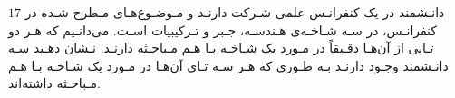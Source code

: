 \EXERCISE
$17$
دانـشمند در یک کنفرانـس علمی شـرکت دارنـد و مـوضـوع‌هـای مـطرح شـده در کنفرانـس، در سـه شـاخـه‌ی هـندسـه، جـبر و تـرکیبیات اسـت. می‌دانـیم که هـر دو تـایی از آن‌هـا دقـیقاً در مـورد یک شـاخـه بـا هـم مـباحـثه دارنـد. نـشان دهـید سـه دانـشمند وجـود دارنـد بـه طـوری که هـر سـه تـای آن‌هـا در مـورد یک شـاخـه بـا هـم مـباحـثه
داشته‌اند.